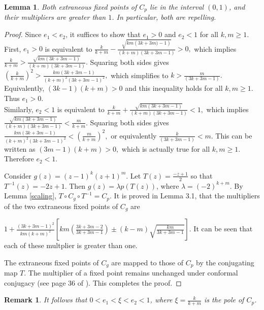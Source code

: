 \documentclass[12pt]{article}
\newtheorem{lem}{Lemma}[section]
\newtheorem{rem}{Remark}[section]
\begin{document}
\begin{lem}
	Both extraneous fixed points of $C_p$ lie in the interval $(0,1)$,  and their multipliers are greater than $1$.  In particular, both are repelling.
	\label{extraneous}
\end{lem}
\begin{proof}
		Since $e_1<e_2$, it suffices to show that $e_1>0$ and $e_2<1$ for all $k,m \geq 1$.\\
	First, $e_1>0$ is equivalent to  $\frac{k}{k+m}-\frac{\sqrt{km\left(3k+3m)-1\right)}}{(k+m)\left(3k+3m-1\right)}>0,$ which implies
	$\frac{k}{k+m}>\frac{\sqrt{km\left(3k+3m-1\right)}}{(k+m)\left(3k+3m-1\right)}.$ Squaring both sides gives
	$\left(\frac{k}{k+m}\right)^2>\frac{km\left(3k+3m-1\right)}{(k+m)^2\left(3k+3m-1\right)^2},$ which simplifies to
	$k>\frac{m}{\left(3k+3m-1\right)}.$ Equivalently,
	$(3k-1)(k+m)>0 $ and this inequality holds for all $k,m \geq 1$. Thus $e_1>0$.\\
	Similarly,
	$e_2<1$ is equivalent to $\frac{k}{k+m}+\frac{\sqrt{km\left(3k+3m-1\right)}}{(k+m)\left(3k+3m-1\right)}<1,$ which implies
	$\frac{\sqrt{km\left(3k+3m-1\right)}}{(k+m)\left(3k+3m-1\right)}<\frac{m}{k+m}.$ Squaring both sides gives
	$\frac{km\left(3k+3m-1\right)}{(k+m)^2\left(3k+3m-1\right)^2}<\left(\frac{m}{k+m}\right)^2,$ or equivalently
	$\frac{k}{\left(3k+3m-1\right)}<m.$ This can be written as
	$(3m-1)(k+m)>0,$  which is actually
	true for all $k,m \geq 1.$ Therefore $e_2<1$.
	
	\par 
	Consider $g(z)=(z-1)^k(z+1)^m$. Let $T(z)=\frac{-z+1}{2}$ so that $T^{-1}(z)=-2z+1$. Then $g(z)=\lambda p(T(z))$, where $\lambda=(-2)^{k+m}$. By Lemma \ref{scaling}, $T \circ C_g \circ T^{-1}=C_p$. It is proved in  Lemma 3.1, \cite{Sym_dyn} that the multipliers of the two extraneous fixed points of $C_g$ are
	
	$1+\frac{(3k+3m-1)^2}{km(k+m)^2} \left[km (\frac{3k+3m-2}{3k+3m-1})\pm(k-m)\sqrt{\frac{km}{3k+3m-1}} \right]$. It can be seen that each of these multplier is greater than one.
	\par  The extraneous fixed points of $C_g$ are mapped to those of $C_p$ by the conjugating map $T$. 
The multiplier of a fixed point remains unchanged under conformal conjugacy (see page 36 of \cite{Beardon_book}). This  completes the proof.
\end{proof}
\begin{rem}
It follows that $0<e_1<\xi<e_2<1$, where $\xi=\frac{k}{k+m}$ is the pole of $C_p$.
\label{extraneous-rem}
\end{rem}
 
\end{document}
